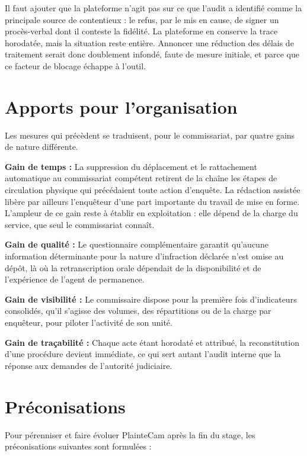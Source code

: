 Il faut ajouter que la plateforme n'agit pas sur ce que l'audit a identifié comme la principale source de contentieux : le refus, par le mis en cause, de signer un procès-verbal dont il conteste la fidélité. La plateforme en conserve la trace horodatée, mais la situation reste entière. Annoncer une réduction des délais de traitement serait donc doublement infondé, faute de mesure initiale, et parce que ce facteur de blocage échappe à l'outil.

\section{Apports pour l'organisation}

Les mesures qui précèdent se traduisent, pour le commissariat, par quatre gains de nature différente.

\textbf{Gain de temps :} La suppression du déplacement et le rattachement automatique au commissariat compétent retirent de la chaîne les étapes de circulation physique qui précédaient toute action d'enquête. La rédaction assistée libère par ailleurs l'enquêteur d'une part importante du travail de mise en forme. L'ampleur de ce gain reste à établir en exploitation : elle dépend de la charge du service, que seul le commissariat connaît.

\textbf{Gain de qualité :} Le questionnaire complémentaire garantit qu'aucune information déterminante pour la nature d'infraction déclarée n'est omise au dépôt, là où la retranscription orale dépendait de la disponibilité et de l'expérience de l'agent de permanence.

\textbf{Gain de visibilité :} Le commissaire dispose pour la première fois d'indicateurs consolidés, qu'il s'agisse des volumes, des répartitions ou de la charge par enquêteur, pour piloter l'activité de son unité.

\textbf{Gain de traçabilité :} Chaque acte étant horodaté et attribué, la reconstitution d'une procédure devient immédiate, ce qui sert autant l'audit interne que la réponse aux demandes de l'autorité judiciaire.

\section{Préconisations}

Pour pérenniser et faire évoluer PlainteCam après la fin du stage, les préconisations suivantes sont formulées :

